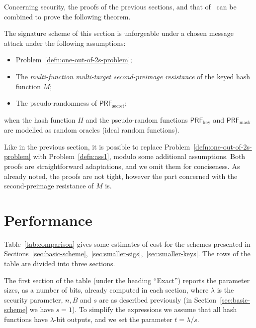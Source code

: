 \documentclass{llncs}
\newcommand{\PRF}{\mathsf{PRF}}
\newcommand{\PRFk}{\PRF_{\mathrm{key}}}
\newcommand{\PRFm}{\PRF_{\mathrm{mask}}}
\newcommand{\PRFs}{\PRF_{\mathrm{secret}}}
\begin{document}
Concerning security, the proofs of the previous sections, and that of~\cite[Appendix~B]{10.1007/978-3-662-49384-7_15} can be combined to prove the following theorem.

\begin{theorem}
  The signature scheme of this section is unforgeable under a chosen
  message attack under the following assumptions:
  \begin{itemize}
  \item Problem~\ref{defn:one-out-of-2s-problem};
  \item The \emph{multi-function multi-target second-preimage resistance} of
    the keyed hash function $M$;
  \item The pseudo-randomness of $\PRFs$;
  \end{itemize}
  when the hash function $H$ and the pseudo-random functions $\PRFk$
  and $\PRFm$ are modelled as random oracles (ideal random functions).
\end{theorem}

Like in the previous section, it is possible to replace Problem~\ref{defn:one-out-of-2s-problem} with Problem~\ref{defn:ass1}, modulo some additional assumptions.
Both proofs are straightforward adaptations, and we omit them for conciseness.
As already noted, the proofs are not tight, however the part concerned with the second-preimage resistance of $M$ is.


\section{Performance}


Table~\ref{tab:comparison} gives some estimates of cost for the schemes presented in Sections~\ref{sec:basic-scheme},~\ref{sec:smaller-sigs},~\ref{sec:smaller-keys}.
The rows of the table are divided into three sections.

The first section of the table (under the heading ``Exact'') reports the parameter sizes, as a number of bits, already computed in each section, where
$\lambda$ is the security parameter, $n,B$ and $s$ are as described previously (in Section~\ref{sec:basic-scheme} we have $s=1$).
To simplify the expressions we assume that all hash functions have $\lambda$-bit outputs, and we set the parameter $t=\lambda/s$.
\end{document}
